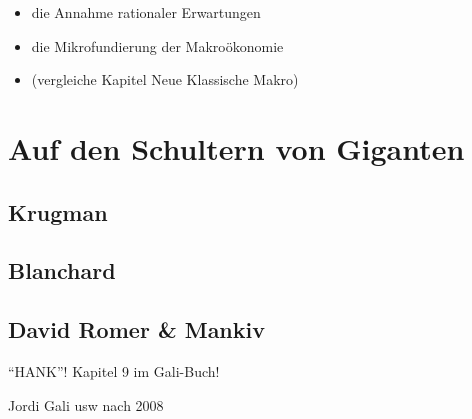 \begin{itemize}
	\item die Annahme rationaler Erwartungen
	\item die Mikrofundierung der Makroökonomie
	\item (vergleiche Kapitel Neue Klassische Makro)
\end{itemize}






\section{Auf den Schultern von Giganten}
\label{Giganten}

\subsection{Krugman}

\subsection{Blanchard}

\subsection{David Romer \& Mankiv}

"`HANK"'!
Kapitel 9 im Gali-Buch!

Jordi Gali usw nach 2008







